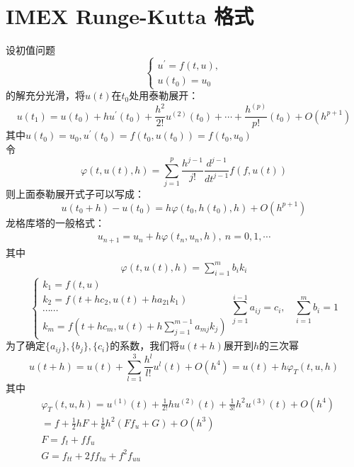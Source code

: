 \documentclass[12pt,a4paper]{article}
\begin{document}
\section{IMEX Runge-Kutta 格式}
设初值问题
\begin{equation*}
\begin{cases}
u^{'}=f(t,u),\\
u(t_{0})=u_{0}
\end{cases}
\end{equation*}
的解充分光滑，将$u(t)$在$t_{0}$处用泰勒展开：
\begin{equation*}
u(t_{1})=u(t_{0})+hu^{'}(t_{0})+\frac{h^2}{2!}u^{(2)}(t_{0})+\cdots+\frac{h^{(p)}}{p!}(t_{0})+O(h^{p+1})
\end{equation*}
其中$u(t_{0})=u_{0},u^{'}(t_{0})=f(t_{0},u(t_{0}))=f(t_{0},u_{0})$\\
令
\begin{equation*}
\varphi(t,u(t),h)=\sum_{j=1}^{p}\frac{h^{j-1}}{j!}\frac{d^{j-1}}{dt^{j-1}}f(f,u(t))
\end{equation*}
则上面泰勒展开式子可以写成：
\begin{equation*}
u(t_{0}+h)-u(t_{0})=h\varphi(t_{0},h(t_{0}),h)+O(h^{p+1})
\end{equation*}
龙格库塔的一般格式：
\begin{gather*}
u_{n+1}=u_{n}+h\varphi(t_{n},u_{n},h),~n=0,1,\cdots
\end{gather*}
其中
\begin{gather}
\varphi(t,u(t),h)=\sum_{i=1}^{m}b_{i}k_{i}
\end{gather}
\begin{equation}
\begin{cases}
k_{1}=f(t,u)\\
k_{2}=f(t+hc_{2},u(t)+ha_{21}k_{1})\\
\cdots\cdots\\
k_{m}=f(t+hc_{m},u(t)+h\sum_{j=1}^{m-1}a_{mj}k_{j})
\end{cases}
\sum_{j=1}^{i-1}a_{ij}=c_{i},~~~~\sum_{i=1}^{m}b_{i}=1
\end{equation}
为了确定$\{a_{ij}\},\{b_{j}\},\{c_{i}\}$的系数，我们将$u(t+h)$展开到$h$的三次幂
\begin{equation*}
u(t+h)=u(t)+\sum_{l=1}^{3}\frac{h^l}{l!}u^{l}(t)+O(h^4)=u(t)+h\varphi_{T}(t,u,h)
\end{equation*}
其中
\begin{align*}
&\varphi_{T}(t,u,h)=u^{(1)}(t)+\frac{1}{2!}hu^{(2)}(t)+\frac{1}{3!}h^2u^{(3)}(t)+O(h^4)\\
&=f+\frac{1}{2}hF+\frac{1}{6}h^2(Ff_{u}+G)+O(h^3)\\
&F=f_{t}+ff_{u}\\
&G=f_{tt}+2ff_{tu}+f^2f_{uu}
\end{align*}
\end{document}
